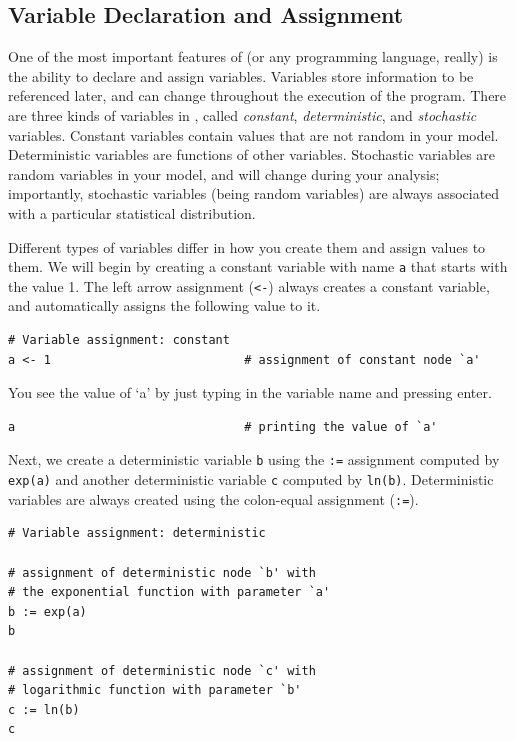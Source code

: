 \subsection{Variable Declaration and Assignment}
One of the most important features of \RevBayes (or any programming language, really) is the ability to declare and assign variables.
Variables store information to be referenced later, and can change throughout the execution of the program.
There are three kinds of variables in \RevBayes, called \emph{constant}, \emph{deterministic}, and \emph{stochastic} variables.
Constant variables contain values that are not random in your model.
Deterministic variables are functions of other variables.
Stochastic variables are random variables in your model, and will change during your analysis; importantly, stochastic variables (being random variables) are always associated with a particular statistical distribution.

Different types of variables differ in how you create them and assign values to them.
We will begin by creating a constant variable with name \texttt{a} that starts with the value 1. 
The left arrow assignment (\texttt{<-}) always creates a constant variable, and automatically assigns the following value to it.
{\tt \begin{snugshade*}
\begin{lstlisting}    
# Variable assignment: constant
a <- 1                           # assignment of constant node `a'
\end{lstlisting}
\end{snugshade*}}
You see the value of `a' by just typing in the variable name and pressing enter.
{\tt \begin{snugshade*}
\begin{lstlisting}    
a                                # printing the value of `a'
\end{lstlisting}
\end{snugshade*}}

Next, we create a deterministic variable \texttt{b} using the \texttt{:=} assignment computed by \texttt{exp(a)} and another deterministic variable \texttt{c} computed by \texttt{ln(b)}. 
Deterministic variables are always created using the colon-equal assignment (\texttt{:=}). 

{\tt \begin{snugshade*}
\begin{lstlisting}    
# Variable assignment: deterministic

# assignment of deterministic node `b' with
# the exponential function with parameter `a'
b := exp(a)  
b

# assignment of deterministic node `c' with
# logarithmic function with parameter `b'
c := ln(b)              
c 
\end{lstlisting}
\end{snugshade*}}

